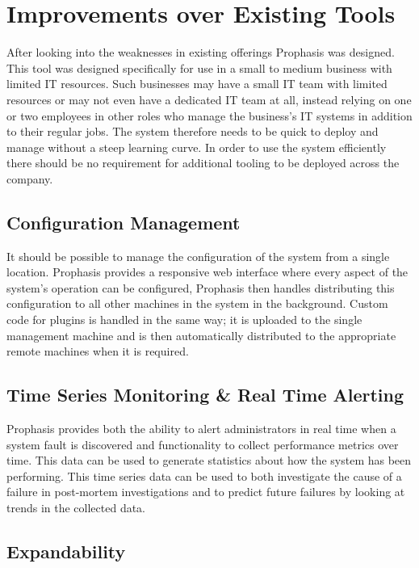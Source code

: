 \documentclass[bsc,deptreport,twoside,parskip,singlespacing,notimes]{infthesis}
\begin{document}

\section{Improvements over Existing Tools}
	After looking into the weaknesses in existing offerings	Prophasis was designed.
	This tool was designed specifically for use in a small to medium business with limited IT
	resources.  Such businesses may have a small IT team with limited resources or may not
	even have a dedicated IT team at all, instead relying on one or two employees
	in other roles who manage the business's IT systems in addition to their
	regular jobs. The system therefore needs to be quick to deploy and manage without
	a steep learning curve. In order to use the system efficiently there should
	be no requirement for additional tooling to be deployed across the company.

\subsection{Configuration Management}

	It should be possible to manage the configuration of the system from a single
	location.  Prophasis provides a responsive web interface where every
	aspect of the system's operation can be configured, Prophasis then handles
	distributing this configuration to all other machines in the system in the
	background. Custom code for plugins is handled in the same way; it is uploaded
	to the single management machine and is then automatically distributed to the
	appropriate remote machines when it is required.

\subsection{Time Series Monitoring \& Real Time Alerting}

	Prophasis provides both the ability to alert administrators in real time when a
	system fault is discovered and functionality to collect
	performance metrics over time. This data can be used to generate statistics about
	how the system has been performing.  This time series data can be used to both
	investigate the cause of a failure in post-mortem investigations and to predict
	future failures by looking at trends in the	collected data.

\subsection{Expandability}
\end{document}
